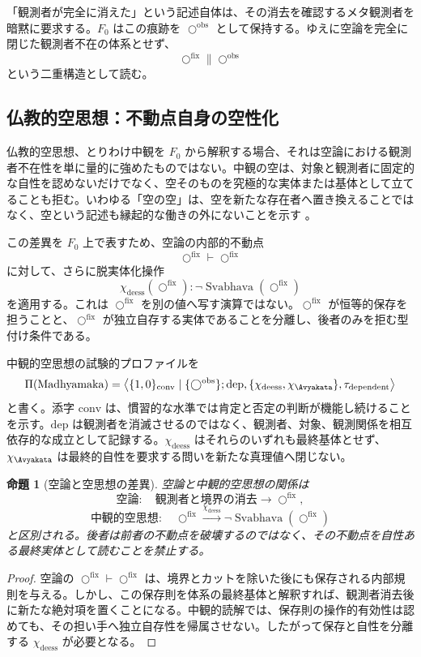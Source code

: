 \documentclass[a4paper,11pt]{ltjsarticle}
\theoremstyle{definition}
\theoremstyle{plain}
\newtheorem{proposition}[definition]{命題}
\newcommand{\Phase}{\Pi}
\newcommand{\ofix}{\bigcirc^{\mathrm{fix}}}
\newcommand{\oobs}{\bigcirc^{\mathrm{obs}}}
\begin{document}
「観測者が完全に消えた」という記述自体は、その消去を確認するメタ観測者を暗黙に要求する。$F_0$ はこの痕跡を $\oobs$ として保持する。ゆえに空論を完全に閉じた観測者不在の体系とせず、
\[
 \ofix\parallel\oobs
\]
という二重構造として読む。

\subsection{仏教的空思想：不動点自身の空性化}

仏教的空思想、とりわけ中観を $F_0$ から解釈する場合、それは空論における観測者不在性を単に量的に強めたものではない。中観の空は、対象と観測者に固定的な自性を認めないだけでなく、空そのものを究極的な実体または基体として立てることも拒む。いわゆる「空の空」は、空を新たな存在者へ置き換えることではなく、空という記述も縁起的な働きの外にないことを示す \cite{Garfield1995,Westerhoff2009}。

この差異を $F_0$ 上で表すため、空論の内部的不動点
\[
 \ofix\vdash\ofix
\]
に対して、さらに脱実体化操作
\[
 \chi_{\mathrm{deess}}(\ofix)
 :
 \neg\operatorname{Svabhava}(\ofix)
\]
を適用する。これは $\ofix$ を別の値へ写す演算ではない。$\ofix$ が恒等的保存を担うことと、$\ofix$ が独立自存する実体であることを分離し、後者のみを拒む型付け条件である。

中観的空思想の試験的プロファイルを
\[
 \Phase(\mathrm{Madhyamaka})
 =
 \left\langle
 \{1,0\}_{\mathrm{conv}}
 \mid
 \{\oobs\};
 \mathrm{dep},
 \{\chi_{\mathrm{deess}},\chi_{\Avyakata}\},
 \tau_{\mathrm{dependent}}
 \right\rangle
\]
と書く。添字 $\mathrm{conv}$ は、慣習的な水準では肯定と否定の判断が機能し続けることを示す。$\mathrm{dep}$ は観測者を消滅させるのではなく、観測者、対象、観測関係を相互依存的な成立として記録する。$\chi_{\mathrm{deess}}$ はそれらのいずれも最終基体とせず、$\chi_{\Avyakata}$ は最終的自性を要求する問いを新たな真理値へ閉じない。

\begin{proposition}[空論と空思想の差異]
空論と中観的空思想の関係は
\[
 \text{空論}:
 \quad
 \text{観測者と境界の消去}
 \longrightarrow
 \ofix,
\]
\[
 \text{中観的空思想}:
 \quad
 \ofix
 \xrightarrow{\chi_{\mathrm{deess}}}
 \neg\operatorname{Svabhava}(\ofix)
\]
と区別される。後者は前者の不動点を破壊するのではなく、その不動点を自性ある最終実体として読むことを禁止する。
\end{proposition}

\begin{proof}
空論の $\ofix\vdash\ofix$ は、境界とカットを除いた後にも保存される内部規則を与える。しかし、この保存則を体系の最終基体と解釈すれば、観測者消去後に新たな絶対項を置くことになる。中観的読解では、保存則の操作的有効性は認めても、その担い手へ独立自存性を帰属させない。したがって保存と自性を分離する $\chi_{\mathrm{deess}}$ が必要となる。
\end{proof}
\end{document}
